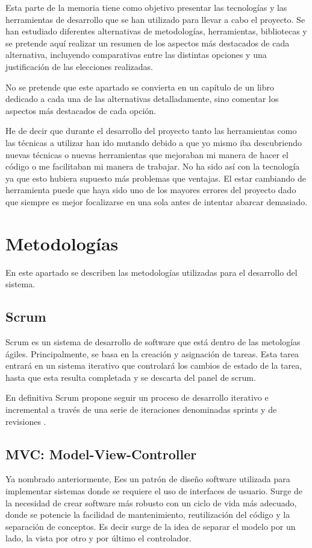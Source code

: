 
Esta parte de la memoria tiene como objetivo presentar las tecnologías y las herramientas de desarrollo que se han utilizado para llevar a cabo el proyecto. Se han estudiado diferentes alternativas de metodologías, herramientas, bibliotecas  y se pretende aquí realizar un resumen de los aspectos más destacados de cada alternativa, incluyendo comparativas entre las distintas opciones y una justificación de las elecciones realizadas. 

No se pretende que este apartado se convierta en un capítulo de un libro dedicado a cada una de las alternativas detalladamente, sino comentar los aspectos más destacados de cada opción.

He de decir que durante el desarrollo del proyecto tanto las herramientas como las técnicas a utilizar han ido mutando debido a que yo mismo iba descubriendo nuevas técnicas o nuevas herramientas que mejoraban mi manera de hacer el código o me facilitaban mi manera de trabajar. No ha sido así con la tecnología ya que esto hubiera supuesto más problemas que ventajas. El estar cambiando de herramienta puede que haya sido uno de los mayores errores del proyecto dado que siempre es mejor focalizarse en una sola antes de intentar abarcar demasiado. 


\section{Metodologías}\label{metodologias}
En este apartado se describen las metodologías utilizadas para el desarrollo del sistema.

\subsection{Scrum}\label{scrum}
Scrum es un sistema de desarrollo de software que está dentro de las metologías ágiles. Principalmente, se basa en la creación y asignación de tareas. Esta tarea entrará en un sistema iterativo que controlará los cambios de estado de la tarea, hasta que esta resulta completada y se descarta del panel de scrum.

En definitiva Scrum propone seguir un proceso de desarrollo iterativo e incremental a través de una serie de iteraciones denominadas sprints y de revisiones \cite{scrumquees}.


\subsection{MVC: Model-View-Controller}\label{mvc}
Ya nombrado anteriormente, Ees un patrón de diseño software utilizada para implementar sistemas donde se requiere el uso de interfaces de usuario. Surge de la necesidad de crear software más robusto con un ciclo de vida más adecuado, donde se potencie la facilidad de mantenimiento, reutilización del código y la separación de conceptos. Es decir surge de la idea de separar el modelo por un lado, la vista por otro y por último el controlador.

